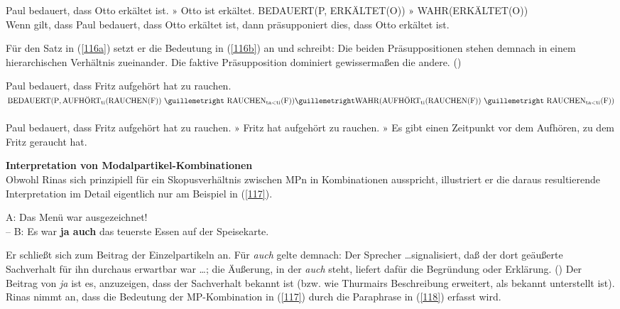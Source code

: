 \begin{exe}
	\ex\label{115} 
		\begin{xlist}	
			\ex\label{115a} Paul bedauert, dass Otto erkältet ist. $»$ Otto ist erkältet.
			\ex\label{115b} BEDAUERT(P, ERKÄLTET(O)) $»$ WAHR(ERKÄLTET(O))\\
			\glq Wenn gilt, dass Paul bedauert, dass Otto erkältet ist, dann präsupponiert dies, dass Otto erkältet ist.\grq {}
			\hfill\hbox {\citet[421]{Rinas2007}}
		\end{xlist}
\end{exe}	  
Für den Satz in (\ref{116a}) setzt er die Bedeutung in (\ref{116b}) an und schreibt: \glqq Die beiden Präsuppositionen  stehen demnach in einem hierarchischen Verhältnis zueinander. Die faktive Präsupposition \glq dominiert\grq {} gewissermaßen die andere.\grqq{} (\citealt[421]{Rinas2007})

\begin{exe}
	\ex\label{116} 
		\begin{xlist}	
			\ex\label{116a} Paul bedauert, dass Fritz aufgehört hat zu rauchen.
			\ex\label{116b} $\textrm{BEDAUERT}(\textrm{P}, \text{AUFHÖRT}_{\textrm{ti}}(\textrm{RAUCHEN(F))} \  » \  \textrm{RAUCHEN}_{\textrm{ta} < \textrm{ti}}(\textrm{F}))\\ 
			» \textrm{WAHR}(\textrm{AUFHÖRT}_{\textrm{ti}}(\textrm{RAUCHEN(F))} \ » \ \textrm{RAUCHEN}_{\textrm{ta} < \textrm{ti}}(\textrm{F}))$\\
			\hbox{}\hfill\hbox{\citet[421]{Rinas2007}}\\
			Paul bedauert, dass Fritz aufgehört hat zu rauchen. $»$ Fritz hat aufgehört zu rauchen. $»$ Es gibt einen Zeitpunkt vor dem Aufhören, zu dem Fritz geraucht hat.
		\end{xlist}
\end{exe}
\textbf{Interpretation von Modalpartikel-Kombinationen}\\
\noindent
Obwohl Rinas sich prinzipiell für ein Skopusverhältnis  zwischen MPn in Kombinationen ausspricht, illustriert er die daraus resultierende Interpretation im Detail eigentlich nur am Beispiel in (\ref{117}).

\begin{exe}
	\ex\label{117} 
		A: Das Menü war ausgezeichnet!\\ 
		– B: Es war \textbf{ja auch} das teuerste Essen auf der Speisekarte.
		\hfill\hbox {\citet[242]{Rinas2007}}
\end{exe}
Er schließt sich \citet[155]{Thurmair1989} zum Beitrag der Einzelpartikeln an. Für \textit{auch} gelte demnach: \glqq Der Sprecher \ldots signalisiert, daß der dort geäußerte Sachverhalt für ihn durchaus erwartbar war \ldots; die Äußerung, in der \textit{auch} steht, liefert dafür die Begründung oder Erklärung.\grqq{} (\citealt[209]{Thurmair1989}) Der Beitrag von \textit{ja} ist es, anzuzeigen, dass der Sachverhalt bekannt ist (bzw. wie \citealt[243-244]{Rinas2007} Thurmairs Beschreibung erweitert, als bekannt unterstellt ist). Rinas nimmt an, dass die Bedeutung der MP-Kombination in (\ref{117}) durch die Paraphrase in (\ref{118}) erfasst wird. 

